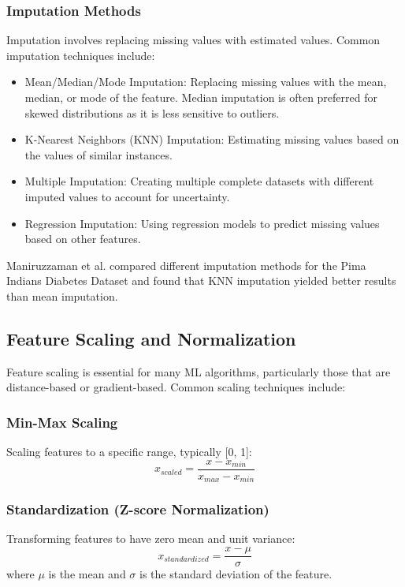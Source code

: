\documentclass[journal]{IEEEtran}
\begin{document}
\subsubsection{Imputation Methods}
Imputation involves replacing missing values with estimated values. Common imputation techniques include:
\begin{itemize}
    \item Mean/Median/Mode Imputation: Replacing missing values with the mean, median, or mode of the feature. Median imputation is often preferred for skewed distributions as it is less sensitive to outliers.
    \item K-Nearest Neighbors (KNN) Imputation: Estimating missing values based on the values of similar instances.
    \item Multiple Imputation: Creating multiple complete datasets with different imputed values to account for uncertainty.
    \item Regression Imputation: Using regression models to predict missing values based on other features.
\end{itemize}

Maniruzzaman et al. \cite{maniruzzaman2017} compared different imputation methods for the Pima Indians Diabetes Dataset and found that KNN imputation yielded better results than mean imputation.

\subsection{Feature Scaling and Normalization}
Feature scaling is essential for many ML algorithms, particularly those that are distance-based or gradient-based. Common scaling techniques include:

\subsubsection{Min-Max Scaling}
Scaling features to a specific range, typically [0, 1]:
\begin{equation}
x_{scaled} = \frac{x - x_{min}}{x_{max} - x_{min}}
\end{equation}

\subsubsection{Standardization (Z-score Normalization)}
Transforming features to have zero mean and unit variance:
\begin{equation}
x_{standardized} = \frac{x - \mu}{\sigma}
\end{equation}
where $\mu$ is the mean and $\sigma$ is the standard deviation of the feature.
\end{document}

